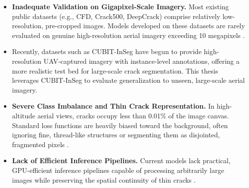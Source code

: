 \begin{itemize}
    \item \textbf{Inadequate Validation on Gigapixel-Scale Imagery.} Most existing public datasets (e.g., CFD, Crack500, DeepCrack) comprise relatively low-resolution, pre-cropped images. Models developed on these datasets are rarely evaluated on genuine high-resolution aerial imagery exceeding 10 megapixels \cite{ 22-pereira-2025, 26-zhang-2024c}.
    
    \item Recently, datasets such as CUBIT-InSeg \cite{10-zhao-2026-cubit-inseg} have begun to provide high-resolution UAV-captured imagery with instance-level annotations, offering a more realistic test bed for large-scale crack segmentation. This thesis leverages CUBIT-InSeg to evaluate generalization to unseen, large-scale aerial imagery.
    
    \item \textbf{Severe Class Imbalance and Thin Crack Representation.} In high-altitude aerial views, cracks occupy less than 0.01\% of the image canvas. Standard loss functions are heavily biased toward the background, often ignoring fine, thread-like structures or segmenting them as disjointed, fragmented pixels \cite{22-pereira-2025, 26-zhang-2024c}.
    
    \item \textbf{Lack of Efficient Inference Pipelines.} Current models lack practical, GPU-efficient inference pipelines capable of processing arbitrarily large images while preserving the spatial continuity of thin cracks \cite{35-kim-2026-tiled-prompts}.
\end{itemize}